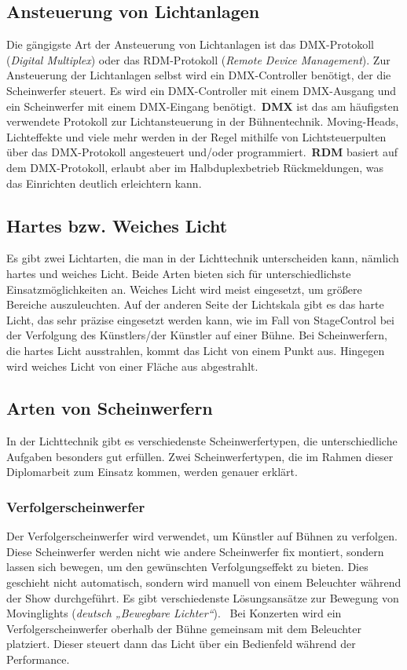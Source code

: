 \subsection{Ansteuerung von Lichtanlagen}
Die gängigste Art der Ansteuerung von Lichtanlagen ist das DMX-Protokoll (\emph{Digital Multiplex}) oder das RDM-Protokoll (\emph{Remote Device Management}). Zur Ansteuerung der Lichtanlagen selbst wird ein DMX-Controller benötigt, der die Scheinwerfer steuert. Es wird ein DMX-Controller mit einem DMX-Ausgang und ein Scheinwerfer mit einem DMX-Eingang benötigt.\
\textbf{DMX} ist das am häufigsten verwendete Protokoll zur Lichtansteuerung in der Bühnentechnik. Moving-Heads, Lichteffekte und viele mehr werden in der Regel mithilfe von Lichtsteuerpulten über das DMX-Protokoll angesteuert und/oder programmiert.\
\textbf{RDM} basiert auf dem DMX-Protokoll, erlaubt aber im Halbduplexbetrieb Rückmeldungen, was das Einrichten deutlich erleichtern kann.\\
\cite{Lichtanlage_RDM_DMX}

\subsection{Hartes bzw. Weiches Licht}
Es gibt zwei Lichtarten, die man in der Lichttechnik unterscheiden kann, nämlich hartes und weiches Licht. Beide Arten bieten sich für unterschiedlichste Einsatzmöglichkeiten an. Weiches Licht wird meist eingesetzt, um größere Bereiche auszuleuchten. Auf der anderen Seite der Lichtskala gibt es das harte Licht, das sehr präzise eingesetzt werden kann, wie im Fall von StageControl bei der Verfolgung des Künstlers/der Künstler auf einer Bühne. Bei Scheinwerfern, die hartes Licht ausstrahlen, kommt das Licht von einem Punkt aus. Hingegen wird weiches Licht von einer Fläche aus abgestrahlt.\\
\cite{Hartes_Weiches_Licht}

\subsection{Arten von Scheinwerfern}
In der Lichttechnik gibt es verschiedenste Scheinwerfertypen, die unterschiedliche Aufgaben besonders gut erfüllen. Zwei Scheinwerfertypen, die im Rahmen dieser Diplomarbeit zum Einsatz kommen, werden genauer erklärt.

\subsubsection{Verfolgerscheinwerfer}
Der Verfolgerscheinwerfer wird verwendet, um Künstler auf Bühnen zu verfolgen. Diese Scheinwerfer werden nicht wie andere Scheinwerfer fix montiert, sondern lassen sich bewegen, um den gewünschten Verfolgungseffekt zu bieten. Dies geschieht nicht automatisch, sondern wird manuell von einem Beleuchter während der Show durchgeführt. Es gibt verschiedenste Lösungsansätze zur Bewegung von Movinglights (\emph{deutsch „Bewegbare Lichter“}). \ Bei Konzerten wird ein Verfolgerscheinwerfer oberhalb der Bühne gemeinsam mit dem Beleuchter platziert. Dieser steuert dann das Licht über ein Bedienfeld während der Performance.\\
\cite{Verfolgerscheinwerfer}

